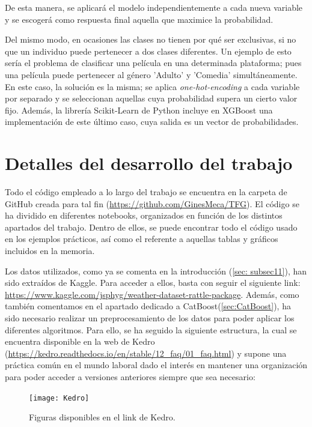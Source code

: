 \documentclass[12pt,twoside]{article}
\begin{document}
De esta manera, se aplicará el modelo independientemente a cada nueva variable y se escogerá como respuesta final aquella que maximice la probabilidad.

Del mismo modo, en ocasiones las clases no tienen por qué ser exclusivas, si no que un individuo puede pertenecer a dos clases diferentes. Un ejemplo de esto sería el problema de clasificar una película en una determinada plataforma; pues una película puede pertenecer al género 'Adulto' y 'Comedia' simultáneamente. En este caso, la solución es la misma; se aplica \textit{one-hot-encoding} a cada variable por separado y se seleccionan aquellas cuya probabilidad supera un cierto valor fijo. Además, la librería Scikit-Learn de Python incluye en XGBoost una implementación de este último caso, cuya salida es un vector de probabilidades. 




\newpage
\appendix
\section{Detalles del desarrollo del trabajo} \label{Anexo}

Todo el código empleado a lo largo del trabajo se encuentra en la carpeta de GitHub creada para tal fin (\url{https://github.com/GinesMeca/TFG}). El código se ha dividido en diferentes notebooks, organizados en función de los distintos apartados del trabajo. Dentro de ellos, se puede encontrar todo el código usado en los ejemplos prácticos, así como el referente a aquellas tablas y gráficos incluidos en la memoria.

Los datos utilizados, como ya se comenta en la introducción (\ref{sec: subsec11}), han sido extraídos de Kaggle. Para acceder a ellos, basta con seguir el siguiente link: \url{https://www.kaggle.com/jsphyg/weather-dataset-rattle-package}. Además, como también comentamos en el apartado dedicado a CatBoost(\ref{sec:CatBoost}), ha sido necesario realizar un preprocesamiento de los datos para poder aplicar los diferentes algoritmos. Para ello, se ha seguido la siguiente estructura, la cual se encuentra disponible en la web de Kedro (\url{https://kedro.readthedocs.io/en/stable/12_faq/01_faq.html}) y supone una práctica común en el mundo laboral dado el interés en mantener una organización para poder acceder a versiones anteriores siempre que sea necesario:
\begin{figure}[h]
\centering
\texttt{[image: Kedro]}
\caption{Figuras disponibles en el link de Kedro.}
\end{figure}
\end{document}
